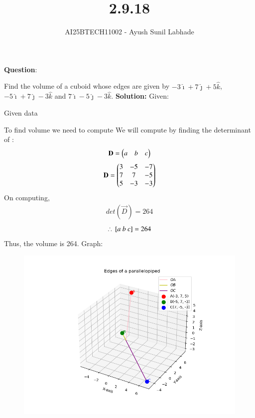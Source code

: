 \documentclass[journal,12pt,onecolumn]{IEEEtran}
\begin{document}
\title{2.9.18}
\author{AI25BTECH11002 - Ayush Sunil Labhade}
{\let\newpage\relax\maketitle}
		\textbf{Question}:\newline

		Find the volume of a cuboid whose edges are given by  $-3\hat{\imath}+7\hat{\jmath}+5\hat{k}$,  $-5\hat{\imath}+7\hat{\jmath}-3\hat{k}$ and  $7\hat{\imath}-5\hat{\jmath}-3\hat{k}$.
		\newline
		\textbf{Solution:}
		Given:
		\begin{table}[H]
			\centering
			
			\label{}
			\caption{Given data}
		\end{table}
		To find volume we need to compute 
		We will compute by finding the determinant of :
		\begin{align}
			\mathbf{D}=\begin{pmatrix}a & b & c\end{pmatrix}
		\end{align}
		\begin{align}
			\mathbf{D} =
		\begin{pmatrix}
3 & -5 & -7 \\
7 & 7 & -5 \\
5 & -3 & -3
\end{pmatrix}
		\end{align}
		On computing,
		\begin{align}
			det(\vec{D})=264
		\end{align}
		\begin{align}
			\therefore {}\left[a \ b \ c\right]=264
		\end{align}
		Thus, the volume is 264.
		\newpage
		Graph:
\begin{figure}[H]
	\centering
	\includegraphics[scale=0.5]{plot}
	\caption*{}
	\label{fig}
\end{figure}
\end{document}
